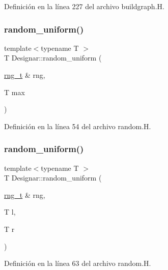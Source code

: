 Definición en la línea 227 del archivo buildgraph.\+H.

\mbox{\label{namespace_designar_a1ac1e0ffd178b0439770840ea75144e0}} 
\subsubsection{\texorpdfstring{random\+\_\+uniform()}{random\_uniform()}\hspace{0.1cm}{\footnotesize\ttfamily [1/2]}}
{\footnotesize\ttfamily template$<$typename T $>$ \\
T Designar\+::random\+\_\+uniform (\begin{DoxyParamCaption}\item[{\hyperlink{namespace_designar_a9ca84e2ff5daa62ebc4dab52f3a6c855}{rng\+\_\+t} \&}]{rng,  }\item[{T}]{max }\end{DoxyParamCaption})}



Definición en la línea 54 del archivo random.\+H.

\mbox{\label{namespace_designar_a7b0ea319994973073cc92067730c1c1c}} 
\subsubsection{\texorpdfstring{random\+\_\+uniform()}{random\_uniform()}\hspace{0.1cm}{\footnotesize\ttfamily [2/2]}}
{\footnotesize\ttfamily template$<$typename T $>$ \\
T Designar\+::random\+\_\+uniform (\begin{DoxyParamCaption}\item[{\hyperlink{namespace_designar_a9ca84e2ff5daa62ebc4dab52f3a6c855}{rng\+\_\+t} \&}]{rng,  }\item[{T}]{l,  }\item[{T}]{r }\end{DoxyParamCaption})}



Definición en la línea 63 del archivo random.\+H.

\mbox{\label{namespace_designar_aae435a76c71e126af37716ef5549d79d}} 
